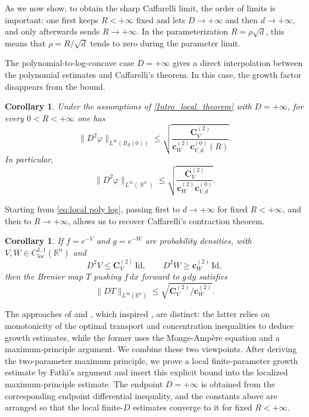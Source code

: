 \documentclass[11pt,a4paper,reqno]{amsart}
\numberwithin{equation}{section}
\newtheorem{corollary}[theorem]{Corollary}
\theoremstyle{definition}
\DeclareMathOperator{\R}{\mathbb{R}}
\newcommand{\<}{\ensuremath \leq}
\renewcommand{\>}{\ensuremath \geq}
\newcommand{\CV}{\mathbf{C}_V}
\newcommand{\cW}{\mathbf{c}_W}
\newcommand{\cVp}[1]{\mathbf{c}_{V,#1}}
\begin{document}
As we now show, to obtain the sharp Caffarelli limit, the order of limits is important: one first keeps $R<+\infty$ fixed and lets $D\to+\infty$ and then $d\to+\infty$, and only afterwards sends $R\to+\infty$. In the parameterization $R=\rho\sqrt d$, this means that $\rho=R/\sqrt d$ tends to zero during the parameter limit.

The polynomial-to-log-concave case $D=+\infty$ gives a direct interpolation between the polynomial estimates and Caffarelli's theorem. In this case, the growth factor disappears from the bound.

\begin{corollary}\label{Intro_poly_log_corollary}
Under the assumptions of \cref{Intro_local_theorem} with $D=+\infty$, for every $0<R<+\infty$ one has
\begin{equation}
    \label{eq:local poly log}
      \|D^2\varphi\|_{L^\infty(B_R(0))}
    \le
    \sqrt{\frac{\CV^{(2)}}{\cW^{(2)}\cVp{d}^{(0)}(R)}}.
\end{equation}
In particular,
\[
    \|D^2\varphi\|_{L^\infty(\R^n)}
    \le
    \sqrt{\frac{\CV^{(2)}}{\cW^{(2)}\cVp{d}^{(0)}}}.
\]

\end{corollary}

Starting from \eqref{eq:local poly log}, passing first to $d\to+\infty$ for fixed $R<+\infty$, and then to $R\to+\infty$, allows us to recover Caffarelli's contraction theorem.

\begin{corollary}\label{Intro_caffarelli_corollary}
If $f=e^{-V}$ and $g=e^{-W}$ are probability densities, with $V,W\in C_{\mathrm{loc}}^{1,1}(\mathbb{R}^n)$ and
\[
    D^2V\le \CV^{(2)}\,\mathrm{Id}, \qquad
    D^2W\ge \cW^{(2)}\,\mathrm{Id},
\]
then the Brenier map $T$ pushing $f\,dx$ forward to $g\,dy$ satisfies
\[
    \|DT\|_{L^\infty(\mathbb{R}^n)}
    \le
    \sqrt{\CV^{(2)}/\cW^{(2)}}.
\]
\end{corollary}

The approaches of \cite{Alessio_Carlier_Santa} and \cite{Colombo_Fathi}, which inspired \cite{Fathi}, are distinct: the latter relies on monotonicity of the optimal transport and concentration inequalities to deduce growth estimates, while the former uses the Monge-Amp\`ere equation and a maximum-principle argument. We combine these two viewpoints. After deriving the two-parameter maximum principle, we prove a local finite-parameter growth estimate by Fathi's argument and insert this explicit bound into the localized maximum-principle estimate. The endpoint $D=+\infty$ is obtained from the corresponding endpoint differential inequality, and the constants above are arranged so that the local finite-$D$ estimates converge to it for fixed $R<+\infty$.
\end{document}
